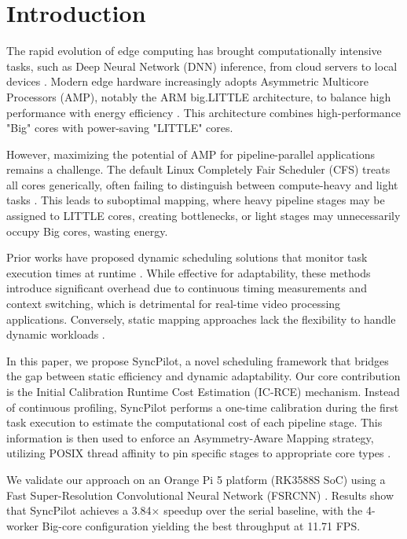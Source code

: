 \documentclass[conference]{IEEEtran}
\begin{document}
\section{Introduction}
The rapid evolution of edge computing has brought computationally intensive tasks, such as Deep Neural Network (DNN) inference, from cloud servers to local devices \cite{shi2016edge, zhou2019edge}. Modern edge hardware increasingly adopts Asymmetric Multicore Processors (AMP), notably the ARM big.LITTLE architecture, to balance high performance with energy efficiency \cite{green2010biglittle, arm2011biglittle}. This architecture combines high-performance "Big" cores with power-saving "LITTLE" cores.

However, maximizing the potential of AMP for pipeline-parallel applications remains a challenge. The default Linux Completely Fair Scheduler (CFS) treats all cores generically, often failing to distinguish between compute-heavy and light tasks \cite{leo2013cfs, curiel2017cfsamp}. This leads to suboptimal mapping, where heavy pipeline stages may be assigned to LITTLE cores, creating bottlenecks, or light stages may unnecessarily occupy Big cores, wasting energy.

Prior works have proposed dynamic scheduling solutions that monitor task execution times at runtime \cite{cherng2014dynamicsched, jia2020runtimeoverhead}. While effective for adaptability, these methods introduce significant overhead due to continuous timing measurements and context switching, which is detrimental for real-time video processing applications. Conversely, static mapping approaches lack the flexibility to handle dynamic workloads \cite{wang2020pipeit}.

In this paper, we propose SyncPilot, a novel scheduling framework that bridges the gap between static efficiency and dynamic adaptability. Our core contribution is the Initial Calibration Runtime Cost Estimation (IC-RCE) mechanism. Instead of continuous profiling, SyncPilot performs a one-time calibration during the first task execution to estimate the computational cost of each pipeline stage. This information is then used to enforce an Asymmetry-Aware Mapping strategy, utilizing POSIX thread affinity to pin specific stages to appropriate core types \cite{solovyev2015pthreadaffinity}.

We validate our approach on an Orange Pi 5 platform (RK3588S SoC) using a Fast Super-Resolution Convolutional Neural Network (FSRCNN) \cite{dong2016fsrcnn}. Results show that SyncPilot achieves a 3.84$\times$ speedup over the serial baseline, with the 4-worker Big-core configuration yielding the best throughput at 11.71 FPS.
\end{document}
